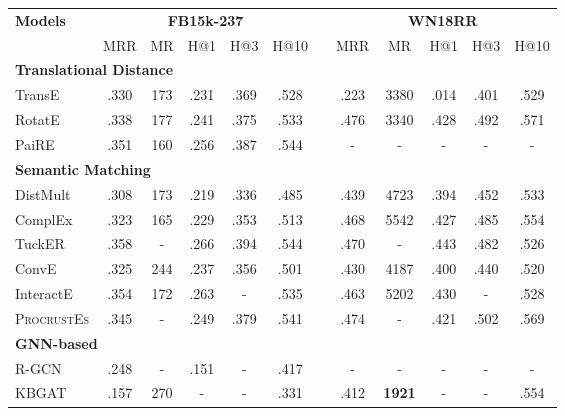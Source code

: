 \documentclass[letterpaper]{article} \usepackage{aaai22}  \usepackage{times}  \usepackage{helvet}  \usepackage{courier}  \usepackage[hyphens]{url}  \usepackage{graphicx} \urlstyle{rm} \def\UrlFont{\rm}  \usepackage{natbib}  \usepackage{caption} \DeclareCaptionStyle{ruled}{labelfont=normalfont,labelsep=colon,strut=off} \frenchspacing  \setlength{\pdfpagewidth}{8.5in}  \setlength{\pdfpageheight}{11in}  \usepackage{algorithm}
\begin{document}
\begin{table*}
    \setlength\tabcolsep{5.7pt}
    \renewcommand\arraystretch{1.1}
    \centering
    \begin{tabular}{lccccccccccc}
      \toprule
      \multirow{2}{*}{\textbf{Models}} & \multicolumn{5}{c}{\textbf{FB15k-237}} & & \multicolumn{5}{c}{\textbf{WN18RR}} \\
      \cline{2-6} \cline{8-12}
      & MRR & MR & H@1 & H@3 & H@10 & & MRR & MR & H@1 & H@3 & H@10 \\
      \hline \hline
      \multicolumn{12}{l}{\textbf{Translational Distance}} \\
      TransE \cite{NeurIPS_2013_Bordes_TransE}     & .330 & 173 & .231 & .369 & .528 & & .223 & 3380 & .014 & .401 & .529 \\
      RotatE \cite{ICLR_2019_Sun_RotatE}      & .338 & 177 & .241 & .375 & .533 & & .476 & 3340 & .428 & .492 & .571 \\
      PaiRE \cite{ACL_2021_Chao_PaiRE}        & .351 & 160 & .256 & .387 & .544 & & - & - & - & - & - \\
      \hline
      \multicolumn{12}{l}{\textbf{Semantic Matching}} \\ 
      DistMult \cite{ICLR_2015_Yang_DistMult}      & .308 & 173 & .219 & .336 & .485 & & .439 & 4723 & .394 & .452 & .533 \\
      ComplEx  \cite{ICML_2016_Trouillon_ComplEx} & .323 & 165 & .229 & .353 & .513 & & .468 & 5542 & .427 & .485 & .554 \\
      TuckER\cite{EMNLP_2019_Balazevic_TuckER} & .358 & -   & .266 & .394 & .544 & & .470 & -    & .443 & .482 & .526 \\
      ConvE  \cite{AAAI_2018_Dettmers_ConvE_WN18RR} & .325 & 244 & .237 & .356 & .501 & & .430 & 4187 & .400 & .440 & .520\\
      InteractE \cite{AAAI_2020_Vashishth_InteractE} & .354 & 172 & .263 & - & .535 & & .463 & 5202 & .430 & - & .528\\ 
      \textsc{ProcrustEs} \cite{NAACL_2021_Peng_ProcrustEs} & .345 & - & .249 & .379 & .541 & & .474 & - & .421 & .502 & .569\\ 
      \hline
      \multicolumn{12}{l}{\textbf{GNN-based}} \\ 
      R-GCN \cite{ESWC_2018_Schlichtkrull_R-GCN}      & .248 & -   & .151 & - & .417 & & -  & -  & -  & - & -    \\
      KBGAT \cite{ACL_2019_Nathani_KBGAT}     & .157 & 270 & - & - & .331 & & .412 & \textbf{1921} & - & - & .554 \\

\end{tabular}
\end{table*}
\end{document}
